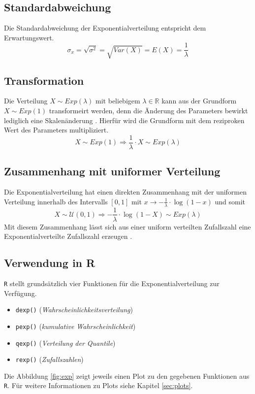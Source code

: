 \subsection{Standardabweichung}
Die Standardabweichung der Exponentialverteilung entspricht dem 
Erwartungswert.
\[  
	\sigma_x = \sqrt{\sigma^2} = \sqrt{Var(X)} = E(X) = \frac{1}{\lambda}
\]

\subsection{Transformation}
Die Verteilung $X \sim Exp(\lambda)$ mit beliebigem $\lambda \in \mathbb{R}$
kann aus der Grundform $X \sim Exp(1)$ transformeirt werden, denn die 
Änderung des Parameters bewirkt lediglich eine Skalenänderung 
\parencite[296]{henze}. Hierfür wird die Grundform mit dem reziproken Wert
des Parameters multipliziert.
\[  
	X \sim Exp(1) \Rightarrow \frac{1}{\lambda} \cdot X \sim Exp(\lambda)	
\]

\subsection{Zusammenhang mit uniformer Verteilung}
Die Exponentialverteilung hat einen direkten Zusammenhang mit der uniformen
Verteilung innerhalb des Intervalls $[0,1]$ mit 
$x \rightarrow -\frac{1}{\lambda} \cdot \log(1-x)$ und somit
\[  
	X \sim \mathcal{U}(0,1) 
		\Rightarrow 
		-\frac{1}{\lambda} \cdot \log(1-X) \sim Exp(\lambda)
\]
Mit diesem Zusammenhang lässt sich aus einer uniform verteilten Zufallszahl 
eine Exponentialverteilte Zufallszahl erzeugen \parencite[297]{henze}.

\subsection{Verwendung in R}
\lstinline{R} stellt grundsätzlich vier Funktionen für die 
Exponentialverteilung zur Verfügung. 
\begin{itemize}
	\item \lstinline{dexp()} \hfill{} 
		(\emph{Wahrscheinlichkeitsverteilung})
	\item \lstinline{pexp()} \hfill{}
		(\emph{kumulative Wahrscheinlichkeit})
	\item \lstinline{qexp()} \hfill{}
		(\emph{Verteilung der Quantile})
	\item \lstinline{rexp()} \hfill{}
		(\emph{Zufallszahlen})
\end{itemize}
Die Abbildung \ref{fig:exp} zeigt jeweils einen Plot zu den gegebenen
Funktionen aus \lstinline{R}. Für weitere Informationen zu Plots siehe
Kapitel \ref{sec:plots}.





